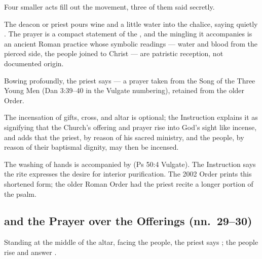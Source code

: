 Four smaller acts fill out the movement, three of them said secretly.

The deacon or priest pours wine and a little water into the chalice, saying quietly
. The prayer is a compact
statement of the , and the mingling it accompanies is an ancient
Roman practice whose symbolic readings --- water and blood from the pierced side, the people
joined to Christ --- are patristic reception, not documented origin.

Bowing profoundly, the priest says  --- a prayer taken from the Song of the Three Young Men (Dan 3:39--40
in the Vulgate numbering), retained from the older Order.

The incensation of gifts, cross, and altar is optional; the Instruction explains it as signifying
that the Church's offering and prayer rise into God's sight like incense, and adds that the
priest, by reason of his sacred ministry, and the people, by reason of their baptismal dignity,
may then be incensed.

The washing of hands is accompanied by  (Ps 50:4 Vulgate). The Instruction says the rite expresses the desire for interior
purification. The 2002 Order prints this shortened form; the older Roman Order had the priest
recite a longer portion of the psalm.

\subsection{ and the Prayer over the Offerings (nn.\ 29--30)}

Standing at the middle of the altar, facing the people, the priest says ; the people rise
and answer .

